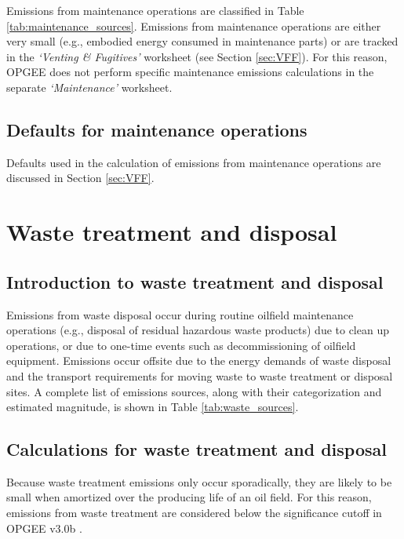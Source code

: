 \documentclass[11pt]{report}
\newcommand{\version}{v3.0b }
\newcommand{\sheet}[1]{\textit{`{#1}'}}
\begin{document}
Emissions from maintenance operations are classified in Table \ref{tab:maintenance_sources}. Emissions from maintenance operations are either very small (e.g., embodied energy consumed in maintenance parts) or are tracked in the \sheet{Venting \& Fugitives} worksheet (see Section \ref{sec:VFF}). For this reason, OPGEE does not perform specific maintenance emissions calculations in the separate \sheet{Maintenance} worksheet.

\subsection{Defaults for maintenance operations}

Defaults used in the calculation of emissions from maintenance operations are discussed in Section \ref{sec:VFF}.


\clearpage

\section{Waste treatment and disposal}
\label{sec:waste}

\subsection{Introduction to waste treatment and disposal}

Emissions from waste disposal occur during routine oilfield maintenance operations (e.g., disposal of residual hazardous waste products) due to clean up operations, or due to one-time events such as decommissioning of oilfield equipment. Emissions occur offsite due to the energy demands of waste disposal and the transport requirements for moving waste to waste treatment or disposal sites. A complete list of emissions sources, along with their categorization and estimated magnitude, is shown in Table \ref{tab:waste_sources}.


\subsection{Calculations for waste treatment and disposal}

Because waste treatment emissions only occur sporadically, they are likely to be small when amortized over the producing life of an oil field. For this reason, emissions from waste treatment are considered below the significance cutoff in OPGEE \version.
\end{document}
